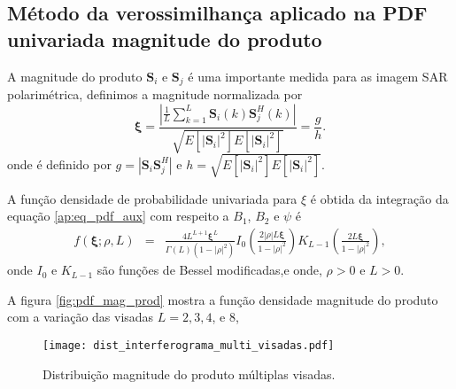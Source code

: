 \subsection{Método da verossimilhança aplicado na PDF univariada magnitude do produto}
A magnitude do produto $\mathbf{S}_i$ e $\mathbf{S}_j$ é uma importante medida para as imagem SAR polarimétrica, definimos a magnitude normalizada por 
\begin{equation}
	\bm\xi = \frac{\left|\frac{1}{L} \sum_{k=1}^L\mathbf{S}_i(k)\mathbf{S}_j^H(k) \right|}{\sqrt{E[|\mathbf{S}_i|^2]E[|\mathbf{S}_i|^2]}}=\frac{g}{h}.
\end{equation}
onde é definido por $g=|\mathbf{S}_i\mathbf{S}_j^H|$ e $h=\sqrt{E[|\mathbf{S}_i|^2]E[|\mathbf{S}_i|^2]}$.

A  função densidade de probabilidade univariada para $\xi$ é obtida da integração da equação \eqref{ap:eq_pdf_aux} com respeito a $B_1$, $B_2$ e $\psi$ é
\begin{equation}\label{eq:pdf_mag_prod}
\begin{array}{lcl}
	f(\bm \xi;\rho, L)&=&\frac{4L^{L+1}\bm\xi^L}{\Gamma(L)(1-|\rho|^2)}I_0\left(\frac{2|\rho|L\bm\xi}{1-|\rho|^2}\right)K_{L-1}\left(\frac{2L\bm\xi}{1-|\rho|^2}\right),
		\end{array}
\end{equation}
onde $I_0$ e $K_{L-1}$ são funções de Bessel modificadas,e onde, $\rho>0$ e $L>0$.


A figura \eqref{fig:pdf_mag_prod} mostra a função densidade magnitude do produto com a variação das visadas $L=2,3,4$, e $8$, 
\begin{figure}[hbt]
\centering
\texttt{[image: dist\_interferograma\_multi\_visadas.pdf]}
	\caption{Distribuição magnitude do produto múltiplas visadas.}
\label{fig:pdf_mag_prod}
\end{figure}


